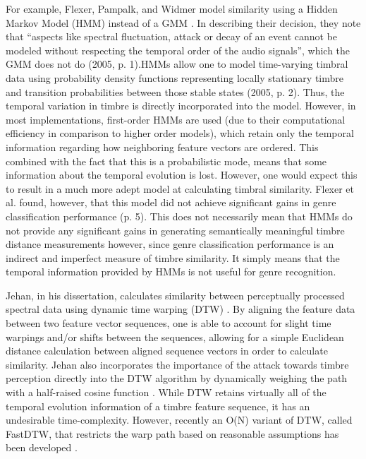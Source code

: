 \documentclass[a4paper,12pt]{report} 	%
\numberwithin{figure}{chapter}
\numberwithin{table}{chapter}
\numberwithin{equation}{chapter}
\begin{document}
\begin{flushleft}
For example, Flexer, Pampalk, and Widmer model similarity using a Hidden Markov Model (HMM) instead of a GMM \cite{Flexer:2005sw}. In describing their decision, they note that ``aspects like spectral fluctuation, attack or decay of an event cannot be modeled without respecting the temporal order of the audio signals'', which the GMM does not do (2005, p. 1).HMMs allow one to model time-varying timbral data using probability density functions representing locally stationary timbre and transition probabilities between those stable states (2005, p. 2). Thus, the temporal variation in timbre is directly incorporated into the model. However, in most implementations, first-order HMMs are used (due to their computational efficiency in comparison to higher order models), which retain only the temporal information regarding how neighboring feature vectors are ordered. This combined with the fact that this is a probabilistic mode, means that some information about the temporal evolution is lost. However, one would expect this to result in a much more adept model at calculating timbral similarity. Flexer et al. found, however, that this model did not achieve significant gains in genre classification performance (p. 5). This does not necessarily mean that HMMs do not provide any significant gains in generating semantically meaningful timbre distance measurements however, since genre classification performance is an indirect and imperfect measure of timbre similarity. It simply means that the temporal information provided by HMMs is not useful for genre recognition.

Jehan, in his dissertation, calculates similarity between perceptually processed spectral data using dynamic time warping (DTW) \cite[p. 70]{Jehan:2005fy}. By aligning the feature data between two feature vector sequences, one is able to account for slight time warpings and/or shifts between the sequences, allowing for a simple Euclidean distance calculation between aligned sequence vectors in order to calculate similarity. Jehan also incorporates the importance of the attack towards timbre perception directly into the DTW algorithm by dynamically weighing the path with a half-raised cosine function \cite[p. 71]{Jehan:2005fy}. While DTW retains virtually all of the temporal evolution information of a timbre feature sequence, it has an undesirable time-complexity. However, recently an O(N) variant of DTW, called FastDTW, that restricts the warp path based on reasonable assumptions has been developed \cite{Salvador:2004et}.


\end{flushleft}
\end{document}
